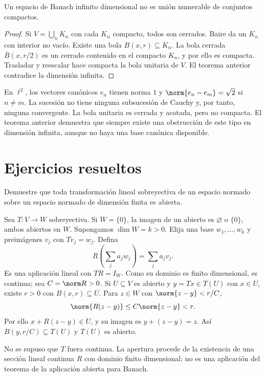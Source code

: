 \begin{corolario}\label{ch22:no-sigma-compacto}
Un espacio de Banach infinito dimensional no es unión numerable de conjuntos compactos.
\end{corolario}
\begin{proof}
Si $V=\bigcup_nK_n$ con cada $K_n$ compacto, todos son cerrados. Baire da un $K_n$ con interior no vacío. Existe una bola $B(x,r)\subseteq K_n$. La bola cerrada $\overline B(x,r/2)$ es un cerrado contenido en el compacto $K_n$, y por ello es compacta. Trasladar y reescalar hace compacta la bola unitaria de $V$. El teorema anterior contradice la dimensión infinita.
\end{proof}

\begin{ejemplo}
En $\ell^2$, los vectores canónicos $e_n$ tienen norma $1$ y $\norm{e_n-e_m}=\sqrt2$ si $n\ne m$. La sucesión no tiene ninguna subsucesión de Cauchy y, por tanto, ninguna convergente. La bola unitaria es cerrada y acotada, pero no compacta. El teorema anterior demuestra que siempre existe una obstrucción de este tipo en dimensión infinita, aunque no haya una base canónica disponible.
\end{ejemplo}

\section{Ejercicios resueltos}

\begin{ejercicio}
Demuestre que toda transformación lineal sobreyectiva de un espacio normado sobre un espacio normado de dimensión finita es abierta.
\end{ejercicio}
\begin{solucion}
Sea $T:V\to W$ sobreyectiva. Si $W=\{0\}$, la imagen de un abierto es $\varnothing$ o $\{0\}$, ambos abiertos en $W$. Supongamos $\dim W=k>0$. Elija una base $w_1,\ldots,w_k$ y preimágenes $v_j$ con $Tv_j=w_j$. Defina
\[
 R\left(\sum_j a_jw_j\right)=\sum_j a_jv_j.
\]
Es una aplicación lineal con $TR=I_W$. Como su dominio es finito dimensional, es continua; sea $C=\norm R>0$. Si $U\subseteq V$ es abierto y $y=Tx\in T(U)$ con $x\in U$, existe $r>0$ con $B(x,r)\subseteq U$. Para $z\in W$ con $\norm{z-y}<r/C$,
\[
 \norm{R(z-y)}\leq C\norm{z-y}<r.
\]
Por ello $x+R(z-y)\in U$, y su imagen es $y+(z-y)=z$. Así $B(y,r/C)\subseteq T(U)$ y $T(U)$ es abierto.

No se supuso que $T$ fuera continua. La apertura procede de la existencia de una sección lineal continua $R$ con dominio finito dimensional; no es una aplicación del teorema de la aplicación abierta para Banach.
\end{solucion}

